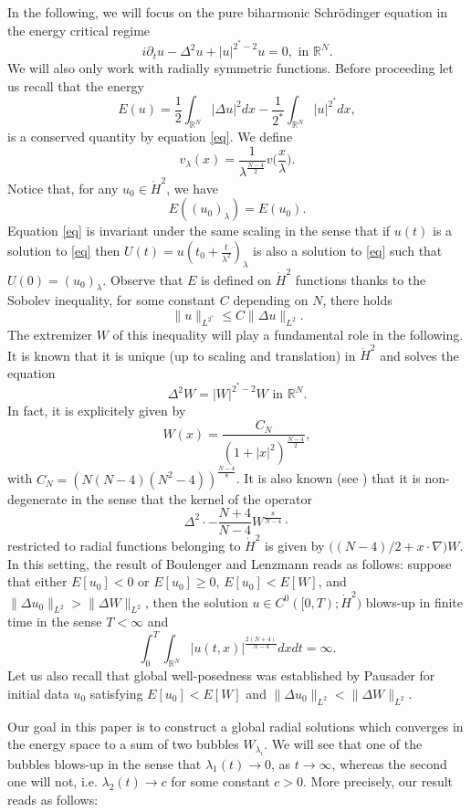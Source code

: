 \documentclass[a4paper,two-side,10pt]{amsart}
\newcommand{\R}{\mathbb{R}}
\numberwithin{equation}{section}
\begin{document}
In the following, we will focus on the pure biharmonic  Schr\" odinger equation in the energy critical regime 
\begin{equation}
\label{eq}
i\partial_t u -\Delta^2 u + |u|^{2^\ast-2} u=0,\text{ in } \R^N.
\end{equation}
We will also only work with radially symmetric functions. Before proceeding let us recall that the energy 
$$E(u)=\dfrac{1}{2}\int_{\R^N} |\Delta u|^2 dx - \dfrac{1}{2^\ast}\int_{\R^N} |u|^{2^\ast} dx,$$
is a conserved quantity by equation \eqref{eq}. We define
$$v_\lambda (x)= \dfrac{1}{\lambda^{\frac{N-4}{2}}} v \big(\frac{x}{\lambda}\big).$$%
Notice that, for any $u_0\in \dot{H}^2$, we have
$$E((u_0)_\lambda )= E(u_0).$$
Equation \eqref{eq} is invariant under the same scaling in the sense that if $u(t)$ is a solution to \eqref{eq} then $U(t)= u(t_0 + \frac{t}{\lambda^2})_\lambda$ is also a solution to \eqref{eq} such that $U(0)=(u_0)_\lambda$. Observe that $E$ is defined on $\dot{H}^2$ functions thanks to the Sobolev inequality, for some constant $C$ depending on $N$, there holds
$$\|u\|_{L^{2^\ast}} \leq C \|\Delta u\|_{L^2}.$$
The extremizer $W$ of this inequality will play a fundamental role in the following. It is known that it is unique (up to scaling and translation) in $\dot{H}^2$ and solves the equation
$$\Delta^2 W = |W|^{2^\ast-2}W\text{ in } \R^N.$$
In fact, it is explicitely given by
$$W(x)= \dfrac{C_N}{(1+|x|^2)^{\frac{N-4}{2}}},$$
with $C_N= (N(N-4)(N^2 -4))^{\frac{N-4}{8}}$. It is also known (see \cite{MR1694339}) that it is non-degenerate in the sense that the kernel of the operator
$$\Delta^2\cdot - \dfrac{N+4}{N-4}W^{\frac{8}{N-4}}\cdot $$
restricted to radial functions belonging to $\dot{H}^2$ is given by $\big((N-4)/2 +x\cdot\nabla\big)W$. In this setting, the result of Boulenger and Lenzmann \cite{bou-lenz} reads as follows: suppose that either $E[u_0]<0$ or $E[u_0]\geq 0$, $E[u_0]<E[W]$, and $\|\Delta u_0\|_{L^2} > \|\Delta W\|_{L^2}$, then the solution $u\in C^0([0,T); \dot{H}^2)$ blows-up in finite time in the sense $T<\infty$ and
$$\int_0^T \int_{\R^N} |u(t,x)|^{\frac{2(N+4)}{N-4}}dx dt =\infty.$$ 
Let us also recall that global well-posedness was established by Pausader \cite{MR2505703} for initial data $u_0$ satisfying $E[u_0]<E[W]$ and $\|\Delta u_0\|_{L^2} < \|\Delta W\|_{L^2}$. 

 Our goal in this paper is to construct a global radial solutions which converges in the energy space to a sum of two bubbles $W_{\lambda_i}$. We will see that one of the bubbles blows-up in the sense that $\lambda_1 (t)\rightarrow 0$, as $t\rightarrow \infty$, whereas the second one will not, i.e. $\lambda_2 (t) \rightarrow c$ for some constant $c>0$. More precisely, our result reads as follows:
\end{document}
